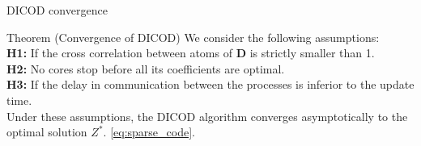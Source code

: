 \documentclass[prez_parietal.tex]{subfiles}
\begin{document}
\begin{frame}{DICOD convergence}


%
%


\begin{beamerboxesrounded}[upper=my title,lower=my body,shadow=true]{
	Theorem (Convergence of DICOD)}
		We consider the following assumptions:\\[.3em]
		{\bf H1: }
		If the cross correlation between atoms of $\pmb D$ is strictly smaller than 1.\\[.3em]
		{\bf H2: }
		No cores stop before all its coefficients are optimal.\\[.3em]
		{\bf H3: }
		If the delay in communication between the processes is inferior to the update time.\\[1em]
		Under these assumptions, the DICOD algorithm converges asymptotically to the
		optimal solution $Z^*$. \mbox{\autoref{eq:sparse_code}}.
	\end{beamerboxesrounded}

\end{frame}
\end{document}
